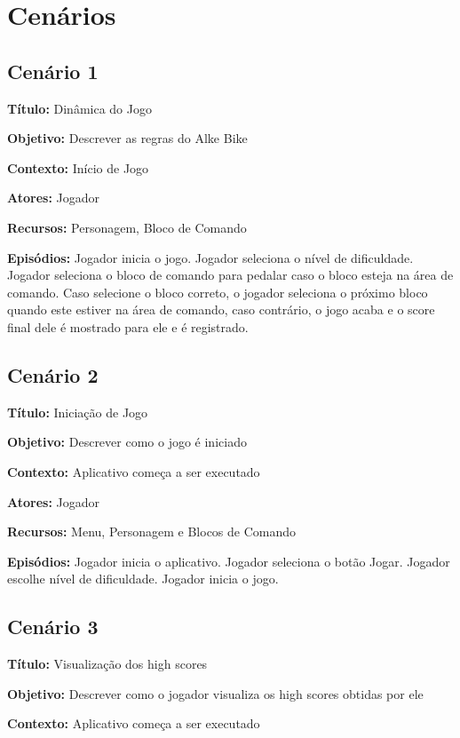 \section{Cenários}
\subsection{Cenário 1}

\textbf{Título:} Dinâmica do Jogo 

\textbf{Objetivo:} Descrever as regras do Alke Bike 

\textbf{Contexto:} Início de Jogo

\textbf{Atores:} Jogador

\textbf{Recursos:} Personagem, Bloco de Comando

\textbf{Episódios:} Jogador inicia o jogo. Jogador seleciona o nível de dificuldade. Jogador seleciona o bloco de comando para pedalar caso o bloco esteja na área de comando. Caso selecione o bloco correto, o jogador seleciona o próximo bloco quando este estiver na área de comando, caso contrário, o jogo acaba e o score final dele é mostrado para ele e é registrado.

\subsection{Cenário 2}

\textbf{Título:} Iniciação de Jogo

\textbf{Objetivo:} Descrever como o jogo é iniciado 

\textbf{Contexto:} Aplicativo começa a ser executado 

\textbf{Atores:} Jogador

\textbf{Recursos:} Menu, Personagem e Blocos de Comando

\textbf{Episódios:} Jogador inicia o aplicativo. Jogador seleciona o botão Jogar. Jogador escolhe nível de dificuldade. Jogador inicia o jogo.

\subsection{Cenário 3}

\textbf{Título:} Visualização dos high scores

\textbf{Objetivo:} Descrever como o jogador visualiza os high scores obtidas por ele

\textbf{Contexto:} Aplicativo começa a ser executado

